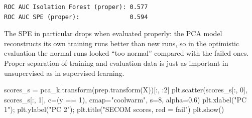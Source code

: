 \documentclass[
  letterpaper,
  DIV=11,
  numbers=noendperiod]{scrreprt}
\newenvironment{Shaded}{\begin{snugshade}}{\end{snugshade}}
\newcommand{\DecValTok}[1]{\textcolor[rgb]{0.68,0.00,0.00}{#1}}
\newcommand{\FloatTok}[1]{\textcolor[rgb]{0.68,0.00,0.00}{#1}}
\newcommand{\NormalTok}[1]{\textcolor[rgb]{0.00,0.23,0.31}{#1}}
\newcommand{\OperatorTok}[1]{\textcolor[rgb]{0.37,0.37,0.37}{#1}}
\newcommand{\StringTok}[1]{\textcolor[rgb]{0.13,0.47,0.30}{#1}}
\begin{document}
\begin{tcolorbox}
\begin{verbatim}
ROC AUC Isolation Forest (proper): 0.577
ROC AUC SPE (proper):              0.594
\end{verbatim}

The SPE in particular drops when evaluated properly: the PCA model
reconstructs its own training runs better than new runs, so in the
optimistic evaluation the normal runs looked ``too normal'' compared
with the failed ones. Proper separation of training and evaluation data
is just as important in unsupervised as in supervised learning.

\end{tcolorbox}

\begin{tcolorbox}[enhanced jigsaw, left=2mm, title=\textcolor{quarto-callout-caution-color}{\faFire}\hspace{0.5em}{Solution to Exercise 2}, opacityback=0, breakable, rightrule=.15mm, arc=.35mm, toptitle=1mm, colbacktitle=quarto-callout-caution-color!10!white, opacitybacktitle=0.6, coltitle=black, colframe=quarto-callout-caution-color-frame, bottomrule=.15mm, leftrule=.75mm, bottomtitle=1mm, titlerule=0mm, toprule=.15mm, colback=white]

\begin{Shaded}
\begin{Highlighting}[]
\NormalTok{scores\_s }\OperatorTok{=}\NormalTok{ pca\_k.transform(prep.transform(X))[:, :}\DecValTok{2}\NormalTok{]}
\NormalTok{plt.scatter(scores\_s[:, }\DecValTok{0}\NormalTok{], scores\_s[:, }\DecValTok{1}\NormalTok{], c}\OperatorTok{=}\NormalTok{(y }\OperatorTok{==} \DecValTok{1}\NormalTok{), cmap}\OperatorTok{=}\StringTok{"coolwarm"}\NormalTok{, s}\OperatorTok{=}\DecValTok{8}\NormalTok{, alpha}\OperatorTok{=}\FloatTok{0.6}\NormalTok{)}
\NormalTok{plt.xlabel(}\StringTok{"PC 1"}\NormalTok{)}\OperatorTok{;}\NormalTok{ plt.ylabel(}\StringTok{"PC 2"}\NormalTok{)}\OperatorTok{;}\NormalTok{ plt.title(}\StringTok{"SECOM scores, red = fail"}\NormalTok{)}
\NormalTok{plt.show()}


\end{Highlighting}
\end{Shaded}
\end{tcolorbox}
\end{document}

